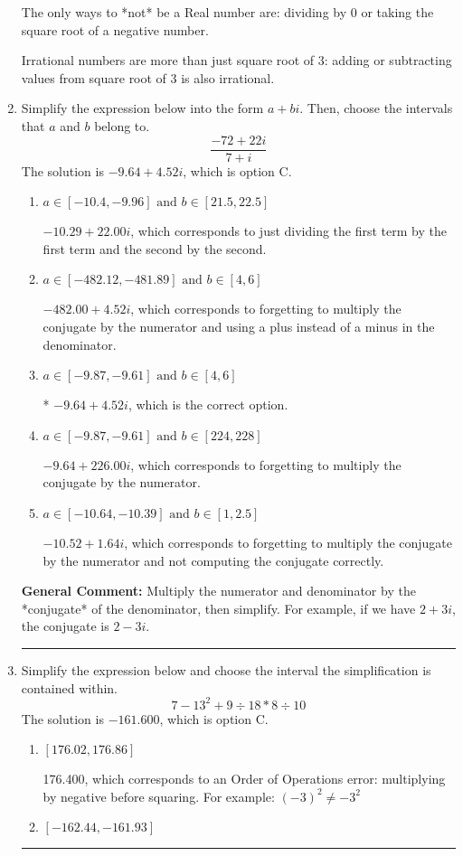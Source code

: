 \documentclass{extbook}[14pt]
\newcommand{\litem}[1]{\item #1

\rule{\textwidth}{0.4pt}}
\begin{document}
\begin{enumerate}
{ The only ways to *not* be a Real number are: dividing by 0 or taking the square root of a negative number. 
 
 Irrational numbers are more than just square root of 3: adding or subtracting values from square root of 3 is also irrational.
}
\litem{
Simplify the expression below into the form $a+bi$. Then, choose the intervals that $a$ and $b$ belong to.
\[ \frac{-72 + 22 i}{7 + i} \]The solution is \( -9.64  + 4.52 i \), which is option C.\begin{enumerate}[label=\Alph*.]
\item \( a \in [-10.4, -9.96] \text{ and } b \in [21.5, 22.5] \)

 $-10.29  + 22.00 i$, which corresponds to just dividing the first term by the first term and the second by the second.
\item \( a \in [-482.12, -481.89] \text{ and } b \in [4, 6] \)

 $-482.00  + 4.52 i$, which corresponds to forgetting to multiply the conjugate by the numerator and using a plus instead of a minus in the denominator.
\item \( a \in [-9.87, -9.61] \text{ and } b \in [4, 6] \)

* $-9.64  + 4.52 i$, which is the correct option.
\item \( a \in [-9.87, -9.61] \text{ and } b \in [224, 228] \)

 $-9.64  + 226.00 i$, which corresponds to forgetting to multiply the conjugate by the numerator.
\item \( a \in [-10.64, -10.39] \text{ and } b \in [1, 2.5] \)

 $-10.52  + 1.64 i$, which corresponds to forgetting to multiply the conjugate by the numerator and not computing the conjugate correctly.
\end{enumerate}

\textbf{General Comment:} Multiply the numerator and denominator by the *conjugate* of the denominator, then simplify. For example, if we have $2+3i$, the conjugate is $2-3i$.
}
\litem{
Simplify the expression below and choose the interval the simplification is contained within.
\[ 7 - 13^2 + 9 \div 18 * 8 \div 10 \]The solution is \( -161.600 \), which is option C.\begin{enumerate}[label=\Alph*.]
\item \( [176.02, 176.86] \)

 176.400, which corresponds to an Order of Operations error: multiplying by negative before squaring. For example: $(-3)^2 \neq -3^2$
\item \( [-162.44, -161.93] \)


\end{enumerate}}
\end{enumerate}
\end{document}
